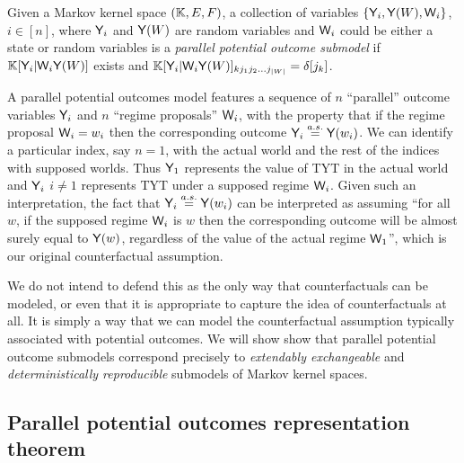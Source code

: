 \begin{definition}\label{def:pa_pot_outcomes}
Given a Markov kernel space $(\mathbb{K},E,F)$, a collection of variables $\{\mathsf{Y}_i, \mathsf{Y}(W), \mathsf{W}_i\}$, $i\in [n]$, where $\mathsf{Y}_i$ and $\mathsf{Y}(W)$ are random variables and $\mathsf{W}_i$ could be either a state or random variables is a \emph{parallel potential outcome submodel} if $\mathbb{K}[\mathsf{Y}_i|\mathsf{W}_i\mathsf{Y}(W)]$ exists and $\mathbb{K}[\mathsf{Y}_i|\mathsf{W}_i\mathsf{Y}(W)]_{k j_1 j_2 ... j_{|W|}} = \delta[j_k]$.
\end{definition}

A parallel potential outcomes model features a sequence of $n$ ``parallel'' outcome variables $\mathsf{Y}_i$ and $n$ ``regime proposals'' $\mathsf{W}_i$, with the property that if the regime proposal $\mathsf{W}_i=w_i$ then the corresponding outcome $\mathsf{Y}_i\overset{a.s.}{=} \mathsf{Y}(w_i)$. We can identify a particular index, say $n=1$, with the actual world and the rest of the indices with supposed worlds. Thus $\mathsf{Y}_1$ represents the value of TYT in the actual world and $\mathsf{Y}_i$ $i\neq 1$ represents TYT under a supposed regime $\mathsf{W}_i$. Given such an interpretation, the fact that $\mathsf{Y}_i\overset{a.s.}{=} \mathsf{Y}(w_i)$ can be interpreted as assuming ``for all $w$, if the supposed regime $\mathsf{W}_i$ is $w$ then the corresponding outcome will be almost surely equal to $\mathsf{Y}(w)$, regardless of the value of the actual regime $\mathsf{W}_1$'', which is our original counterfactual assumption.

We do not intend to defend this as the only way that counterfactuals can be modeled, or even that it is appropriate to capture the idea of counterfactuals at all. It is simply a way that we can model the counterfactual assumption typically associated with potential outcomes. We will show show that parallel potential outcome submodels correspond precisely to \emph{extendably exchangeable} and \emph{deterministically reproducible} submodels of Markov kernel spaces.


\subsection{Parallel potential outcomes representation theorem}


